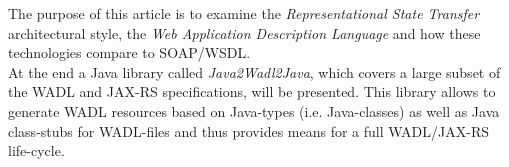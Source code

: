 The purpose of this article is to examine the \emph{Representational State Transfer} architectural style, the \emph{Web Application Description Language} and how these technologies compare to SOAP/WSDL.
\\
At the end a Java library called \emph{Java2Wadl2Java}, which covers a large subset of the WADL and JAX-RS specifications, will be presented. This library allows to generate WADL resources based on Java-types (i.e. Java-classes) as well as Java class-stubs for WADL-files and thus provides means for a full WADL/JAX-RS life-cycle.